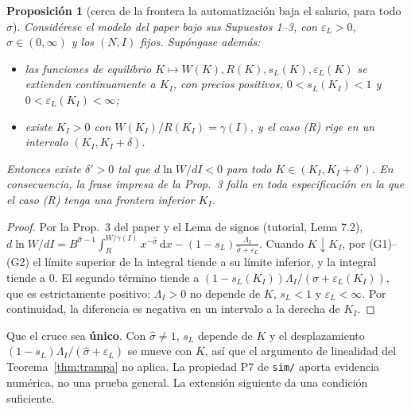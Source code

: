 \documentclass[11pt,a4paper]{article}
\numberwithin{equation}{section}
\theoremstyle{definition}
\theoremstyle{plain}
\newtheorem{proposicion}[definicion]{Proposición}
\theoremstyle{remark}
\newcommand{\eps}{\varepsilon}
\newcommand{\dd}{\,\mathrm{d}}
\newcommand{\sh}{\hat\sigma}
\begin{document}
\begin{proposicion}[cerca de la frontera la automatización baja el salario, para todo $\sh$]\label{prop:general}
Considérese el modelo del paper bajo sus Supuestos 1–3, con $\eps_L>0$, $\sh\in(0,\infty)$ y los $(N,I)$ fijos.
Supóngase además:
\begin{itemize}[nosep]
  \item[\textsf{(G1)}] las funciones de equilibrio $K\mapsto W(K),R(K),s_L(K),\eps_L(K)$ se extienden continuamente a $K_I$, con precios positivos, $0<s_L(K_I)<1$ y $0<\eps_L(K_I)<\infty$;
  \item[\textsf{(G2)}] existe $K_I>0$ con $W(K_I)/R(K_I)=\gamma(I)$, y el caso (R) rige en un intervalo $(K_I,K_I+\delta)$.
\end{itemize}
Entonces existe $\delta'>0$ tal que $d\ln W/dI<0$ para todo $K\in(K_I,K_I+\delta')$. En consecuencia, la frase impresa
de la Prop.~3 falla en toda especificación en la que el caso (R) tenga una frontera inferior $K_I$.
\end{proposicion}
\begin{proof}
Por la Prop.~3 del paper y el Lema de signos (tutorial, Lema 7.2),
$d\ln W/dI=B^{\sh-1}\int_{R}^{W/\gamma(I)}x^{-\sh}\dd x-(1-s_L)\frac{\Lambda_I}{\sh+\eps_L}$. Cuando $K\downarrow K_I$,
por (G1)–(G2) el límite superior de la integral tiende a su límite inferior, y la integral tiende a $0$. El segundo
término tiende a $(1-s_L(K_I))\Lambda_I/(\sh+\eps_L(K_I))$, que es estrictamente positivo: $\Lambda_I>0$ no depende
de $K$, $s_L<1$ y $\eps_L<\infty$. Por continuidad, la diferencia es negativa en un intervalo a la derecha de $K_I$.
\end{proof}

\begin{nota}[Lo que \emph{no} se demuestra con $\sh\ne1$]
Que el cruce sea \textbf{único}. Con $\sh\ne1$, $s_L$ depende de $K$ y el desplazamiento $(1-s_L)\Lambda_I/(\sh+\eps_L)$
se mueve con $K$, así que el argumento de linealidad del Teorema~\ref{thm:trampa} no aplica. La propiedad P7 de \texttt{sim/} aporta evidencia numérica, no una prueba general. La extensión siguiente da una condición suficiente.
\end{nota}

\end{document}
